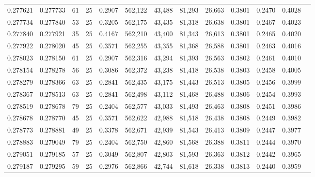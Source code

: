 \begin{tabular}{rrrrrrrrrrrrr}
0.277621 & 0.277733 &    61 &  25 &                                     0.2907 & 562,122 &  43,488 &  81,293 &  26,663 & 0.3801 & 0.2470 & 0.4028 \\
0.277734 & 0.277840 &    53 &  25 &                                     0.3205 & 562,175 &  43,435 &  81,318 &  26,638 & 0.3801 & 0.2467 & 0.4023 \\
0.277840 & 0.277921 &    35 &  25 &                                     0.4167 & 562,210 &  43,400 &  81,343 &  26,613 & 0.3801 & 0.2465 & 0.4020 \\
0.277922 & 0.278020 &    45 &  25 &                                     0.3571 & 562,255 &  43,355 &  81,368 &  26,588 & 0.3801 & 0.2463 & 0.4016 \\
0.278023 & 0.278150 &    61 &  25 &                                     0.2907 & 562,316 &  43,294 &  81,393 &  26,563 & 0.3802 & 0.2461 & 0.4010 \\
0.278154 & 0.278278 &    56 &  25 &                                     0.3086 & 562,372 &  43,238 &  81,418 &  26,538 & 0.3803 & 0.2458 & 0.4005 \\
0.278279 & 0.278366 &    63 &  25 &                                     0.2841 & 562,435 &  43,175 &  81,443 &  26,513 & 0.3805 & 0.2456 & 0.3999 \\
0.278367 & 0.278513 &    63 &  25 &                                     0.2841 & 562,498 &  43,112 &  81,468 &  26,488 & 0.3806 & 0.2454 & 0.3993 \\
0.278519 & 0.278678 &    79 &  25 &                                     0.2404 & 562,577 &  43,033 &  81,493 &  26,463 & 0.3808 & 0.2451 & 0.3986 \\
0.278678 & 0.278770 &    45 &  25 &                                     0.3571 & 562,622 &  42,988 &  81,518 &  26,438 & 0.3808 & 0.2449 & 0.3982 \\
0.278773 & 0.278881 &    49 &  25 &                                     0.3378 & 562,671 &  42,939 &  81,543 &  26,413 & 0.3809 & 0.2447 & 0.3977 \\
0.278883 & 0.279049 &    79 &  25 &                                     0.2404 & 562,750 &  42,860 &  81,568 &  26,388 & 0.3811 & 0.2444 & 0.3970 \\
0.279051 & 0.279185 &    57 &  25 &                                     0.3049 & 562,807 &  42,803 &  81,593 &  26,363 & 0.3812 & 0.2442 & 0.3965 \\
0.279187 & 0.279295 &    59 &  25 &                                     0.2976 & 562,866 &  42,744 &  81,618 &  26,338 & 0.3813 & 0.2440 & 0.3959 \\

\end{tabular}
